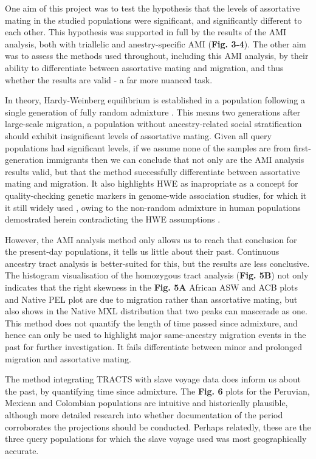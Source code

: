 \documentclass[11pt]{article}
\begin{document}
One aim of this project was to test the hypothesis that the levels of assortative mating in the studied populations were significant, and significantly different to each other. This hypothesis was supported in full by the results of the AMI analysis, both with triallelic and anestry-specific AMI (\textbf{Fig. 3-4}). The other aim was to assess the methods used throughout, including this AMI analysis, by their ability to differentiate between assortative mating and migration, and thus whether the results are valid - a far more nuanced task.

In theory, Hardy-Weinberg equilibrium is established in a population following a single generation of fully random admixture \parencite{Smithjohn2015}. This means two generations after large-scale migration, a population without ancestry-related social stratification should exhibit insignificant levels of assortative mating. Given all query populations had significant levels, if we assume none of the samples are from first-generation immigrants then we can conclude that not only are the AMI analysis results valid, but that the method successfully differentiate between assortative mating and migration. It also highlights HWE as inapropriate as a concept for quality-checking genetic markers in genome-wide association studies, for which it it still widely used \parencite{Linares-Pineda2012}, owing to the non-random admixture in human populations demostrated herein contradicting the HWE assumptions \parencite{Smithjohn2015}.

However, the AMI analysis method only allows us to reach that conclusion for the present-day populations, it tells us little about their past. Continuous ancestry tract analysis is better-suited for this, but the results are less conclusive. The histogram visualisation of the homozygous tract analysis (\textbf{Fig. 5B}) not only indicates that the right skewness in the \textbf{Fig. 5A} African ASW and ACB plots and Native PEL plot are due to migration rather than assortative mating, but also shows in the Native MXL distribution that two peaks can mascerade as one. This method does not quantify the length of time passed since admixture, and hence can only be used to highlight major same-ancestry migration events in the past for further investigation. It fails differentiate between minor and prolonged migration and assortative mating. 

The method integrating TRACTS with slave voyage data does inform us about the past, by quantifying time since admixture. The \textbf{Fig. 6} plots for the Peruvian, Mexican and Colombian populations are intuitive and historically plausible, although more detailed research into whether documentation of the period corroborates the projections should be conducted. Perhaps relatedly, these are the three query populations for which the slave voyage used was most geographically accurate.
\end{document}
